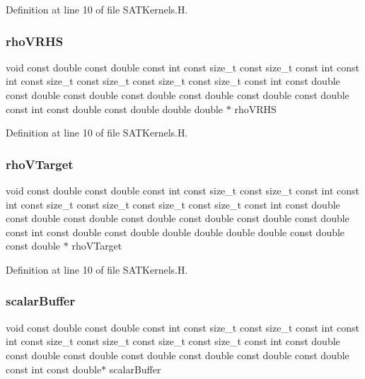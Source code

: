 Definition at line 10 of file S\+A\+T\+Kernels.\+H.

\hypertarget{SATKernels_8H_acb9b38017a6743d94bee14616af8c393}{}\label{SATKernels_8H_acb9b38017a6743d94bee14616af8c393} 
\subsubsection{\texorpdfstring{rho\+V\+R\+HS}{rhoVRHS}}
{\footnotesize\ttfamily void const double const double const int const size\+\_\+t const size\+\_\+t const int const int const size\+\_\+t const size\+\_\+t const size\+\_\+t const size\+\_\+t const int const double const double const double const double const double const double const double const int const double const double double double $\ast$ rho\+V\+R\+HS}



Definition at line 10 of file S\+A\+T\+Kernels.\+H.

\hypertarget{SATKernels_8H_aca8f44b9d6cddd0f8e4997848b063b4c}{}\label{SATKernels_8H_aca8f44b9d6cddd0f8e4997848b063b4c} 
\subsubsection{\texorpdfstring{rho\+V\+Target}{rhoVTarget}}
{\footnotesize\ttfamily void const double const double const int const size\+\_\+t const size\+\_\+t const int const int const size\+\_\+t const size\+\_\+t const size\+\_\+t const size\+\_\+t const int const double const double const double const double const double const double const double const int const double const double double double double double const double const double $\ast$ rho\+V\+Target}



Definition at line 10 of file S\+A\+T\+Kernels.\+H.

\hypertarget{SATKernels_8H_a77f85158b3e3bd2ba599050be5a7b444}{}\label{SATKernels_8H_a77f85158b3e3bd2ba599050be5a7b444} 
\subsubsection{\texorpdfstring{scalar\+Buffer}{scalarBuffer}}
{\footnotesize\ttfamily void const double const double const int const size\+\_\+t const size\+\_\+t const int const int const size\+\_\+t const size\+\_\+t const size\+\_\+t const size\+\_\+t const int const double const double const double const double const double const double const double const int const double$\ast$ scalar\+Buffer}



